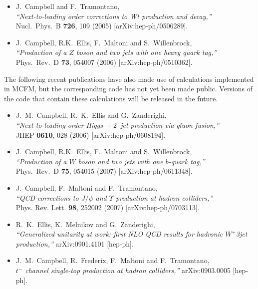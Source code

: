 \documentclass[12pt]{article}
\begin{document}
\begin{itemize}
  {\it ``Single top production and decay at next-to-leading order,''} \\
  Phys.\ Rev.\ D {\bf 70}, 094012 (2004)
  [arXiv:hep-ph/0408158].
\item J.~Campbell and F.~Tramontano, \\
  {\it ``Next-to-leading order corrections to Wt production and
  decay,''} \\
  Nucl.\ Phys.\ B {\bf 726}, 109 (2005)
  [arXiv:hep-ph/0506289].
\item J.~Campbell, R.K.~Ellis, F.~Maltoni and S.~Willenbrock, \\
  {\it ``Production of a $Z$ boson and two jets with one heavy
  quark tag,''} \\
  Phys.\ Rev.\ D {\bf 73}, 054007 (2006)
  [arXiv:hep-ph/0510362].
\end{itemize}

The following recent publications have also made use of calculations
implemented in MCFM, but the corresponding code has not yet been made
public. Versions of the code that contain these calculations will be
released in the future.

\begin{itemize}
\item J.~M.~Campbell, R.~K.~Ellis and G.~Zanderighi, \\
  {\it ``Next-to-leading order Higgs~$+~2$~jet production via
  gluon fusion,''} \\
  JHEP {\bf 0610}, 028 (2006)
  [arXiv:hep-ph/0608194].
\item J.~Campbell, R.K.~Ellis, F.~Maltoni and S.~Willenbrock, \\
  {\it ``Production of a $W$ boson and two jets with one $b$-quark
  tag,''} \\
  Phys.\ Rev.\ D {\bf 75}, 054015 (2007)
  [arXiv:hep-ph/0611348].
\item J.~Campbell, F.~Maltoni and F.~Tramontano, \\
  {\it ``QCD corrections to $J/\psi$ and $\Upsilon$ production
  at hadron colliders,''} \\
  Phys. Rev. Lett. {\bf 98}, 252002 (2007)
  [arXiv:hep-ph/0703113].
\item R.~K.~Ellis, K.~Melnikov and G.~Zanderighi,\\
  {\it ``Generalized unitarity at work: first NLO QCD results for hadronic $W^+$3jet production,''}
  arXiv:0901.4101 [hep-ph].
\item J.~M.~Campbell, R.~Frederix, F.~Maltoni and F.~Tramontano,\\
  {\it $t^-$ channel single-top production at hadron colliders,''}
  arXiv:0903.0005 [hep-ph].
\end{itemize}
\end{document}
